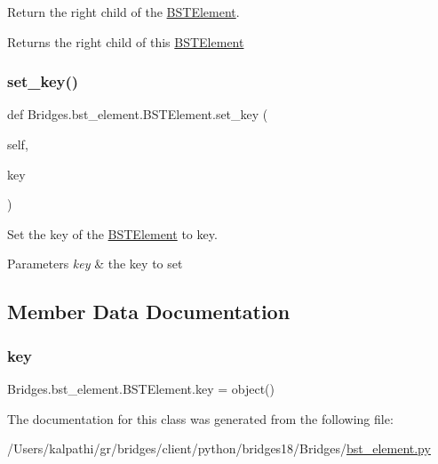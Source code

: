 Return the right child of the \mbox{\hyperlink{class_bridges_1_1bst__element_1_1_b_s_t_element}{B\+S\+T\+Element}}. 

\begin{DoxyReturn}{Returns}
the right child of this \mbox{\hyperlink{class_bridges_1_1bst__element_1_1_b_s_t_element}{B\+S\+T\+Element}} 
\end{DoxyReturn}
\mbox{\label{class_bridges_1_1bst__element_1_1_b_s_t_element_ad72900f1e40534cbfe8b88d37e391750}} 
\subsubsection{\texorpdfstring{set\+\_\+key()}{set\_key()}}
{\footnotesize\ttfamily def Bridges.\+bst\+\_\+element.\+B\+S\+T\+Element.\+set\+\_\+key (\begin{DoxyParamCaption}\item[{}]{self,  }\item[{}]{key }\end{DoxyParamCaption})}



Set the key of the \mbox{\hyperlink{class_bridges_1_1bst__element_1_1_b_s_t_element}{B\+S\+T\+Element}} to key. 


\begin{DoxyParams}{Parameters}
{\em key} & the key to set \\
\hline
\end{DoxyParams}


\subsection{Member Data Documentation}
\mbox{\label{class_bridges_1_1bst__element_1_1_b_s_t_element_a1b04a3676ac84d889491f8a496aedb91}} 
\subsubsection{\texorpdfstring{key}{key}}
{\footnotesize\ttfamily Bridges.\+bst\+\_\+element.\+B\+S\+T\+Element.\+key = object()\hspace{0.3cm}{\ttfamily [static]}}



The documentation for this class was generated from the following file\+:\begin{DoxyCompactItemize}
\item 
/\+Users/kalpathi/gr/bridges/client/python/bridges18/\+Bridges/\mbox{\hyperlink{bst__element_8py}{bst\+\_\+element.\+py}}\end{DoxyCompactItemize}
